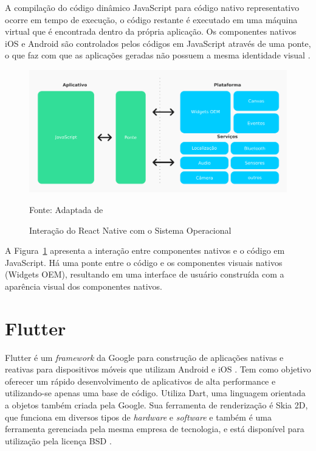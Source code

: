 A compilação do código dinâmico JavaScript para código nativo representativo ocorre em tempo de execução, o código restante é executado em uma máquina virtual que é encontrada dentro da própria aplicação. Os componentes nativos iOS e Android são controlados pelos códigos em JavaScript através de uma ponte, o que faz com que as aplicações geradas não possuem a mesma identidade visual \cite{yatsenko2019comparative}. 

\begin{figure}[H]
    \centering
    \includegraphics[width=15cm]{imagens/interacaoReactNative.png}
    \caption{Interação do React Native com o Sistema Operacional}
    Fonte: Adaptada de \cite{yatsenko2019comparative}
    \label{fig: Interação React Native SO}
\end{figure}

A Figura~\ref{fig: Interação React Native SO} apresenta a interação entre componentes nativos e o código em JavaScript. Há uma ponte entre o código e os componentes visuais nativos (Widgets OEM), resultando em uma interface de usuário construída com a aparência visual dos componentes nativos.

\section{Flutter}

Flutter é um \textit{framework} da Google para construção de aplicações nativas e reativas para dispositivos móveis que utilizam Android e iOS \cite{zammetti2019practical}. Tem como objetivo oferecer um rápido desenvolvimento de aplicativos de alta performance e utilizando-se apenas uma base de código. Utiliza Dart, uma linguagem orientada a objetos também criada pela Google. Sua ferramenta de renderização é Skia 2D, que funciona em diversos tipos de \textit{hardware} e \textit{software} e também é uma ferramenta gerenciada pela mesma empresa de tecnologia, e está disponível para utilização pela licença BSD \cite{napoli2019beginning}. 

